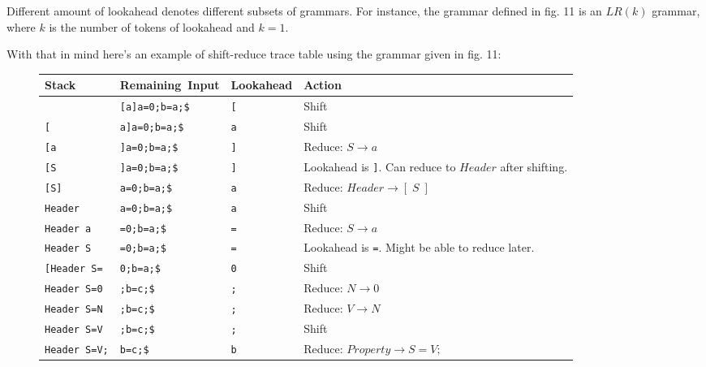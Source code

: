 \documentclass[12pt, letterpaper]{article}
\theoremstyle{definition}
\begin{document}
Different amount of lookahead denotes different subsets of grammars. For instance, the grammar defined in fig. 11 is an $LR(k)$ grammar, where $k$ is the number of tokens of lookahead and $k=1$.

With that in mind here's an example of shift-reduce trace table using the grammar given in fig. 11:

\begin{figure}[H]
    \begin{center}
        \begin{tabular}{| m{3.5cm} | m{3cm} | m{2cm} | m{5cm} |}
            \hline
            Stack & \mbox{Remaining Input} & Lookahead & Action\\
            \hline
            & \verb|[a]a=0;b=a;$| & \verb|[| & Shift\\
            \hline
            \verb|[| & \verb|a]a=0;b=a;$| & \verb|a| & Shift\\
            \hline
            \verb|[a| & \verb|]a=0;b=a;$| & \verb|]| & Reduce: $S \rightarrow a$\\
            \hline
            \verb|[S| & \verb|]a=0;b=a;$| & \verb|]| & Lookahead is \verb|]|. Can reduce to $Header$ after shifting.\\
            \hline
            \verb|[S]| & \verb|a=0;b=a;$| & \verb|a| & Reduce: $Header \rightarrow [\;S\;]$\\
            \hline
            \verb|Header| & \verb|a=0;b=a;$| & \verb|a| & Shift\\
            \hline
            \verb|Header a| & \verb|=0;b=a;$| & \verb|=| & Reduce: $S \rightarrow a$\\
            \hline
            \verb|Header S| & \verb|=0;b=a;$| & \verb|=| & Lookahead is \verb|=|. Might be able to reduce later.\\
            \hline
            \verb|[Header S=| & \verb|0;b=a;$| & \verb|0| & Shift\\
            \hline
            \verb|Header S=0| & \verb|;b=c;$| & \verb|;| & Reduce: $N \rightarrow 0$\\
            \hline
            \verb|Header S=N| & \verb|;b=c;$| & \verb|;| & Reduce: $V \rightarrow N$\\
            \hline
            \verb|Header S=V| & \verb|;b=c;$| & \verb|;| & Shift\\
            \hline
            \verb|Header S=V;| & \verb|b=c;$| & \verb|b| & Reduce: $Property \rightarrow S = V;$\\
            \hline

\end{tabular}
\end{center}
\end{figure}
\end{document}
